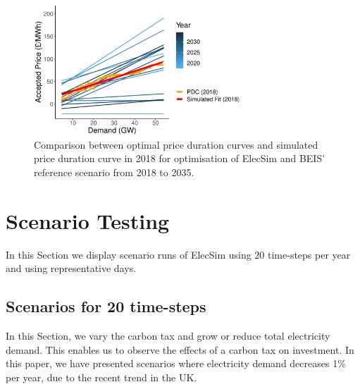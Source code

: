 \begin{figure}
	\centering
	\includegraphics[width=0.7\textwidth, keepaspectratio]{Chapter4/figures/e-Energy-2020/results/scenario_analysis/optimal_pdc_prices.pdf}
	\caption{Comparison between optimal price duration curves and simulated price duration curve in 2018 for optimisation of ElecSim and BEIS' reference scenario from 2018 to 2035.}
	\label{fig:forward_scenario_best_pdcs}
\end{figure}






\clearpage
\section{Scenario Testing}
\label{elecsim:sec:scenarios}

In this Section we display scenario runs of ElecSim using 20 time-steps per year and using representative days.

\subsection{Scenarios for 20 time-steps}

In this Section, we vary the carbon tax and grow or reduce total electricity demand. This enables us to observe the effects of a carbon tax on investment. In this paper, we have presented scenarios where electricity demand decreases 1\% per year, due to the recent trend in the UK.


